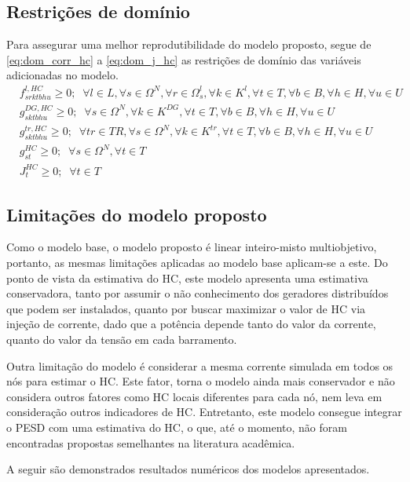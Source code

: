 \vspace{-0.25cm}
\subsection{Restrições de domínio}

Para assegurar uma melhor reprodutibilidade do modelo proposto, segue de \eqref{eq:dom_corr_hc} a \eqref{eq:dom_j_hc} as restrições de domínio das variáveis adicionadas no modelo.
\begin{align}
&f^{l, HC}_{srktbhu} \geq 0; \; \;\forall l \in L, \forall s \in \Omega^N, \forall r \in \Omega^l_s, \forall k \in K^l, \forall t \in T, \forall b \in B , \forall h \in H, \forall u \in U \label{eq:dom_corr_hc}\\
&g^{DG, HC}_{sktbhu} \geq 0; \; \; \forall s \in \Omega^N, \forall k \in K^{DG}, \forall t \in T, \forall b \in B, \forall h \in H, \forall u \in U \label{eq:dom_gd_hc}\\
&g^{tr, HC}_{sktbhu} \geq 0; \; \; \forall tr \in TR, \forall s \in \Omega^N, \forall k \in K^{tr}, \forall t \in T, \forall b \in B, \forall h \in H, \forall u \in U\\
&g^{HC}_{st} \geq 0 ; \; \; \forall s \in \Omega^N, \forall t \in T \label{eq:dom_g_hc}\\
&J^{HC}_{t} \geq 0 ; \; \; \forall t \in T \label{eq:dom_j_hc}
\end{align}

\subsection{Limitações do modelo proposto}

Como o modelo base, o modelo proposto é linear inteiro-misto multiobjetivo, portanto, as mesmas limitações aplicadas ao modelo base aplicam-se a este. Do ponto de vista da estimativa do \ac{HC}, este modelo apresenta uma estimativa conservadora, tanto por assumir o não conhecimento dos geradores distribuídos que podem ser instalados, quanto por buscar maximizar o valor de \ac{HC} via injeção de corrente, dado que a potência depende tanto do valor da corrente, quanto do valor da tensão em cada barramento.

Outra limitação do modelo é considerar a mesma corrente simulada em todos os nós para estimar o \ac{HC}. Este fator, 
torna o modelo ainda mais conservador e não considera outros fatores como \ac{HC} locais diferentes para cada nó, nem leva em consideração outros indicadores de \ac{HC}. Entretanto, este modelo consegue integrar o \ac{PESD} com uma estimativa do \ac{HC}, o que, até o momento, não foram encontradas propostas semelhantes na literatura acadêmica. 

A seguir são demonstrados resultados numéricos dos modelos apresentados.
